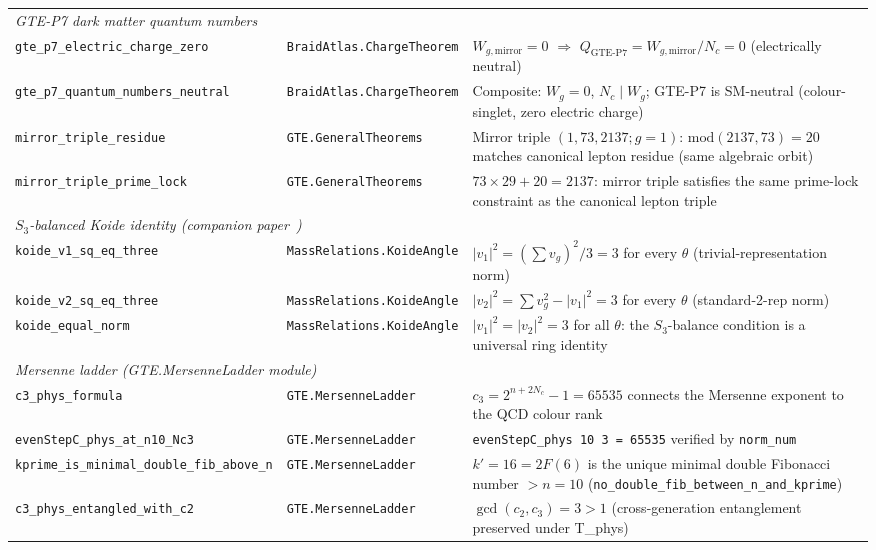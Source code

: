 \documentclass[10pt]{article}
\begin{document}
\begin{longtable}{@{} p{3.8cm} p{4.8cm} p{4.8cm} @{}}
\multicolumn{3}{l}{\textit{GTE-P7 dark matter quantum numbers}} \\[2pt]
\nolinkurl{gte_p7_electric_charge_zero} & \nolinkurl{BraidAtlas.ChargeTheorem} & $W_{g,\mathrm{mirror}} = 0$ $\Rightarrow$ $Q_{\mathrm{GTE\text{-}P7}} = W_{g,\mathrm{mirror}}/N_c = 0$ (electrically neutral) \\
\nolinkurl{gte_p7_quantum_numbers_neutral} & \nolinkurl{BraidAtlas.ChargeTheorem} & Composite: $W_g{=}0$, $N_c\mid W_g$; GTE-P7 is SM-neutral (colour-singlet, zero electric charge) \\
\nolinkurl{mirror_triple_residue} & \nolinkurl{GTE.GeneralTheorems} & Mirror triple $(1,73,2137;g{=}1)$: $\mathrm{mod}(2137,73)=20$ matches canonical lepton residue (same algebraic orbit) \\
\nolinkurl{mirror_triple_prime_lock} & \nolinkurl{GTE.GeneralTheorems} & $73\times 29 + 20 = 2137$: mirror triple satisfies the same prime-lock constraint as the canonical lepton triple \\[4pt]

\multicolumn{3}{l}{\textit{$S_3$-balanced Koide identity (companion paper~\cite{Spivack2026_Koide})}} \\[2pt]
\nolinkurl{koide_v1_sq_eq_three} & \nolinkurl{MassRelations.KoideAngle} & $|v_1|^2 = (\sum v_g)^2/3 = 3$ for every $\theta$ (trivial-representation norm) \\
\nolinkurl{koide_v2_sq_eq_three} & \nolinkurl{MassRelations.KoideAngle} & $|v_2|^2 = \sum v_g^2 - |v_1|^2 = 3$ for every $\theta$ (standard-2-rep norm) \\
\nolinkurl{koide_equal_norm} & \nolinkurl{MassRelations.KoideAngle} & $|v_1|^2 = |v_2|^2 = 3$ for all $\theta$: the $S_3$-balance condition is a universal ring identity \\[4pt]

\multicolumn{3}{l}{\textit{Mersenne ladder (GTE.MersenneLadder module)}} \\[2pt]
\nolinkurl{c3_phys_formula} & \nolinkurl{GTE.MersenneLadder} & $c_3 = 2^{n+2N_c}-1 = 65535$ connects the Mersenne exponent to the QCD colour rank \\
\nolinkurl{evenStepC_phys_at_n10_Nc3} & \nolinkurl{GTE.MersenneLadder} & \texttt{evenStepC\_phys 10 3 = 65535} verified by \texttt{norm\_num} \\
\nolinkurl{kprime_is_minimal_double_fib_above_n} & \nolinkurl{GTE.MersenneLadder} & $k'=16 = 2F(6)$ is the unique minimal double Fibonacci number $> n=10$
(\texttt{no\_double\_fib\_between\allowbreak\_n\_and\_kprime}) \\
\nolinkurl{c3_phys_entangled_with_c2} & \nolinkurl{GTE.MersenneLadder} & $\gcd(c_2, c_3) = 3 > 1$ (cross-generation entanglement preserved under T\_phys) \\[4pt]


\end{longtable}
\end{document}
